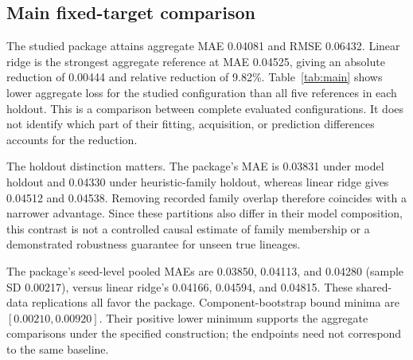 \documentclass{article}
\begin{document}
\subsection{Main fixed-target comparison}
\begin{table}[t]
\centering

\caption{Sealed-target MAE, lower is better, averaged equally over reporting budgets and seeds. Overall gives equal weight to model and heuristic-family holdouts. All five evaluated reference methods are included. Different acquisition policies prevent treating low-rank references as component ablations.}
\label{tab:main}
\end{table}

The studied package attains aggregate MAE 0.04081 and RMSE 0.06432. Linear ridge is the strongest aggregate reference at MAE 0.04525, giving an absolute reduction of 0.00444 and relative reduction of 9.82\%. Table~\ref{tab:main} shows lower aggregate loss for the studied configuration than all five references in each holdout. This is a comparison between complete evaluated configurations. It does not identify which part of their fitting, acquisition, or prediction differences accounts for the reduction.

The holdout distinction matters. The package's MAE is 0.03831 under model holdout and 0.04330 under heuristic-family holdout, whereas linear ridge gives 0.04512 and 0.04538. Removing recorded family overlap therefore coincides with a narrower advantage. Since these partitions also differ in their model composition, this contrast is not a controlled causal estimate of family membership or a demonstrated robustness guarantee for unseen true lineages.

The package's seed-level pooled MAEs are 0.03850, 0.04113, and 0.04280 (sample SD 0.00217), versus linear ridge's 0.04166, 0.04594, and 0.04815. These shared-data replications all favor the package. Component-bootstrap bound minima are $[0.00210,0.00920]$. Their positive lower minimum supports the aggregate comparisons under the specified construction; the endpoints need not correspond to the same baseline.
\end{document}
